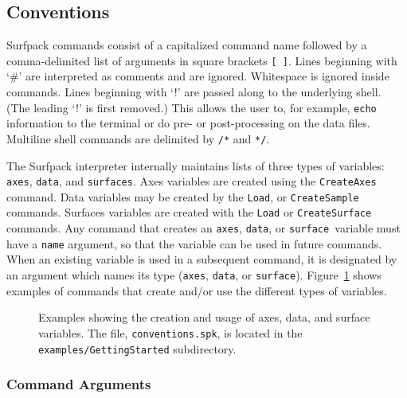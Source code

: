 \documentclass{article}
\begin{document}
\subsection{Conventions}\label{sec:conventions}
Surfpack commands consist of a capitalized command name followed by a
comma-delimited list of arguments in square brackets \texttt{[ ]}.  Lines beginning with  `\#' are interpreted as comments and are ignored.  Whitespace is ignored inside commands. Lines beginning with `!' are passed along to the underlying shell.  (The
leading `!' is first removed.)  This allows the user to, for example, \texttt{echo}
information to the terminal or do pre- or post-processing on the data files.
Multiline shell commands are delimited by \texttt{/*} and \texttt{*/}.

The Surfpack interpreter internally maintains lists of three types of variables: \texttt{axes},
\texttt{data}, and \texttt{surfaces}.  Axes variables are created using the \texttt{CreateAxes}
command.  Data variables may be created by the \texttt{Load}, or \texttt{CreateSample}
commands.  Surfaces variables are created with the \texttt{Load} or
\texttt{CreateSurface} commands.  Any command that creates an \texttt{axes}, \texttt{data}, or \texttt{surface
}variable must have a \texttt{name} argument, so that the variable can be used in 
future commands.  When an existing variable is
used in a subsequent command, it is designated by an argument which names its
type (\texttt{axes}, \texttt{data}, or \texttt{surface}).  Figure~\ref{fig:conventions} shows examples of commands that create and/or use the different types of variables. 

\begin{figure}[htbp]
  \centering
  \begin{bigbox}
	\begin{small}
 	\end{small}
  \end{bigbox}
  \caption{Examples showing the creation and usage of axes, data, and surface variables.  The file, \texttt{conventions.spk}, is located in the \texttt{examples/GettingStarted} subdirectory.}
   \label{fig:conventions}
\end{figure}

\subsubsection{Command Arguments}\label{sec:arguments}
\end{document}
